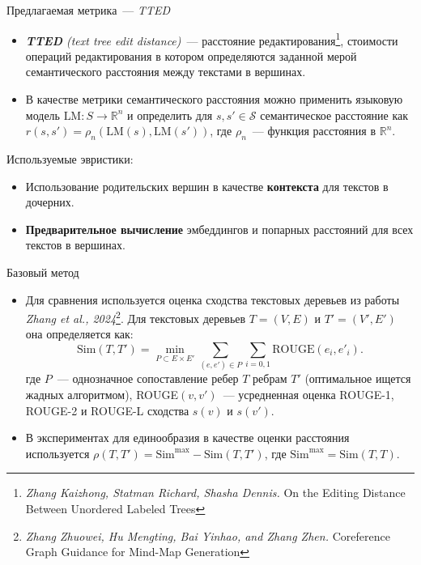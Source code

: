 \documentclass{beamer}
\newcommand{\R}{\mathbb{R}}
\begin{document}

\begin{frame}{Предлагаемая метрика~--- \textit{TTED}}

\begin{itemize}
    \item \textit{\textbf{TTED} (text tree edit distance)}~--- расстояние редактирования\footnote{\textit{Zhang Kaizhong, Statman Richard, Shasha Dennis.} On the Editing Distance Between Unordered Labeled Trees}, стоимости операций редактирования в котором определяются заданной мерой семантического расстояния между текстами в вершинах. 
    \item В качестве метрики семантического расстояния можно применить языковую модель $\text{LM}: S \rightarrow \R^n$ и определить для $s, s'\in\mathcal{S}$ семантическое расстояние как $r(s, s') = \rho_n(\text{LM}(s), \text{LM}(s'))$, где $\rho_n$~--- функция расстояния в $\R^n$.
\end{itemize}
\begin{block}{Используемые эвристики:}
    \begin{itemize}
        \item Использование родительских вершин в качестве \textbf{контекста} для текстов в дочерних.
        \item \textbf{Предварительное вычисление} эмбеддингов и попарных расстояний для всех текстов в вершинах.
    \end{itemize}    
\end{block}

\end{frame}


\begin{frame}{Базовый метод}

\begin{itemize}
\item Для сравнения используется оценка сходства текстовых деревьев из работы \textit{Zhang et al., 2024}\footnote{\textit{Zhang Zhuowei, Hu Mengting, Bai Yinhao, and Zhang Zhen.} Coreference Graph Guidance for Mind-Map Generation}. Для текстовых деревьев $T=(V, E)$ и $T'=(V',E')$ она определяется как:
$$
\text{Sim}(T, T') = \min\limits_{P\subset E\times E'} \sum\limits_{(e, e')\in P}\sum\limits_{i=0,1}\text{ROUGE}(e_i, e'_i).
$$
где $P$~--- однозначное сопоставление ребер $T$ ребрам $T'$ (оптимальное ищется жадных алгоритмом), ROUGE$(v, v')$~--- усредненная оценка ROUGE-1, ROUGE-2 и ROUGE-L сходства $s(v)$ и $s(v')$.
\item В экспериментах для единообразия в качестве оценки расстояния используется $\rho(T, T') = \text{Sim}^{\max} - \text{Sim}(T, T')$, где $\text{Sim}^{\max} = \text{Sim}(T, T)$.
\end{itemize}

\end{frame}
\end{document}
